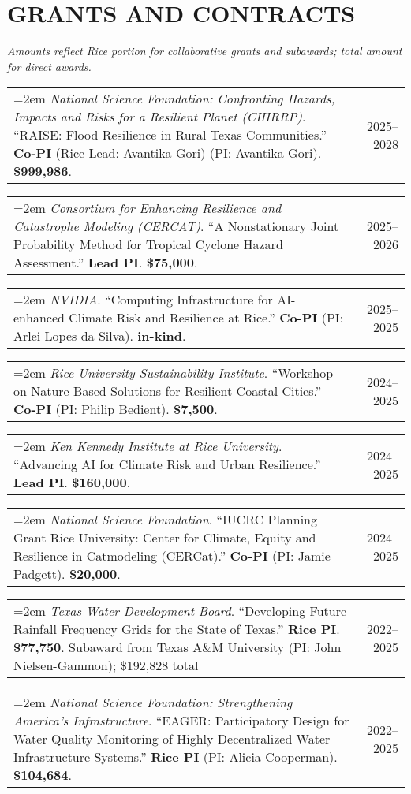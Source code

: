 \documentclass[10pt,oneside]{article}
\makeatletter
\newenvironment{alignedentrieshang}[1][2em]{%
  \noindent%
}{%
}
\newcommand{\hangingitem}[2]{%
  \noindent%
  \begin{tabular*}{\textwidth}{@{}p{0.85\textwidth}@{\extracolsep{\fill}}r@{}}%
    \hangindent=2em \hangafter=1 #1 & #2%
  \end{tabular*}%
}
\makeatother
\begin{document}
\section{GRANTS AND CONTRACTS}

\textit{Amounts reflect Rice portion for collaborative grants and subawards; total amount for direct awards.}

\medskip

\begin{alignedentrieshang}

\hangingitem{\textit{National Science Foundation}\textit{: Confronting Hazards, Impacts and Risks for a Resilient Planet (CHIRRP)}. ``RAISE: Flood Resilience in Rural Texas Communities.'' \textbf{Co-PI} (Rice Lead: Avantika Gori) (PI: Avantika Gori). \textbf{\$999,986}.}{2025--2028}

\hangingitem{\textit{Consortium for Enhancing Resilience and Catastrophe Modeling (CERCAT)}. ``A Nonstationary Joint Probability Method for Tropical Cyclone Hazard Assessment.'' \textbf{Lead PI}. \textbf{\$75,000}.}{2025--2026}

\hangingitem{\textit{NVIDIA}. ``Computing Infrastructure for AI-enhanced Climate Risk and Resilience at Rice.'' \textbf{Co-PI} (PI: Arlei Lopes da Silva). \textbf{in-kind}.}{2025--2025}

\hangingitem{\textit{Rice University Sustainability Institute}. ``Workshop on Nature-Based Solutions for Resilient Coastal Cities.'' \textbf{Co-PI} (PI: Philip Bedient). \textbf{\$7,500}.}{2024--2025}

\hangingitem{\textit{Ken Kennedy Institute at Rice University}. ``Advancing AI for Climate Risk and Urban Resilience.'' \textbf{Lead PI}. \textbf{\$160,000}.}{2024--2025}

\hangingitem{\textit{National Science Foundation}. ``IUCRC Planning Grant Rice University: Center for Climate, Equity and Resilience in Catmodeling (CERCat).'' \textbf{Co-PI} (PI: Jamie Padgett). \textbf{\$20,000}.}{2024--2025}

\hangingitem{\textit{Texas Water Development Board}. ``Developing Future Rainfall Frequency Grids for the State of Texas.'' \textbf{Rice PI}. \textbf{\$77,750}. Subaward from Texas A\&M University (PI: John Nielsen-Gammon); \$192,828 total}{2022--2025}

\hangingitem{\textit{National Science Foundation}\textit{: Strengthening America's Infrastructure}. ``EAGER: Participatory Design for Water Quality Monitoring of Highly Decentralized Water Infrastructure Systems.'' \textbf{Rice PI} (PI: Alicia Cooperman). \textbf{\$104,684}.}{2022--2025}


\end{alignedentrieshang}
\end{document}
